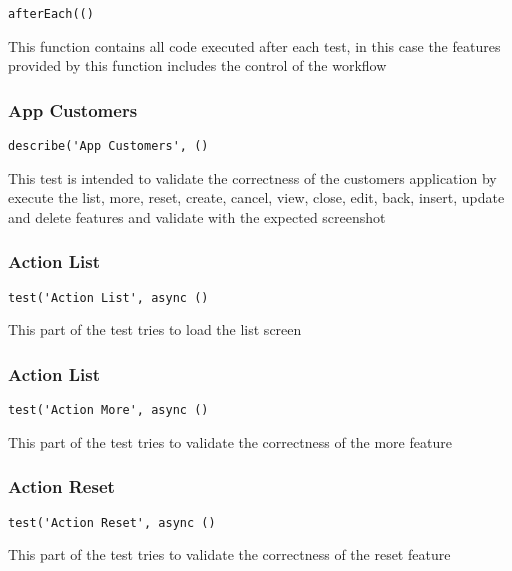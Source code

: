 \documentclass[a4paper]{article}
\begin{document}
\begin{lstlisting}
afterEach(()
\end{lstlisting}

This function contains all code executed after each test, in this case the
features provided by this function includes the control of the workflow

\hypertarget{toc115}{}
\subsubsection{App Customers}

\begin{lstlisting}
describe('App Customers', ()
\end{lstlisting}

This test is intended to validate the correctness of the customers application
by execute the list, more, reset, create, cancel, view, close, edit, back,
insert, update and delete features and validate with the expected screenshot

\hypertarget{toc116}{}
\subsubsection{Action List}

\begin{lstlisting}
test('Action List', async ()
\end{lstlisting}

This part of the test tries to load the list screen

\hypertarget{toc117}{}
\subsubsection{Action List}

\begin{lstlisting}
test('Action More', async ()
\end{lstlisting}

This part of the test tries to validate the correctness of the more feature

\hypertarget{toc118}{}
\subsubsection{Action Reset}

\begin{lstlisting}
test('Action Reset', async ()
\end{lstlisting}

This part of the test tries to validate the correctness of the reset feature
\end{document}
